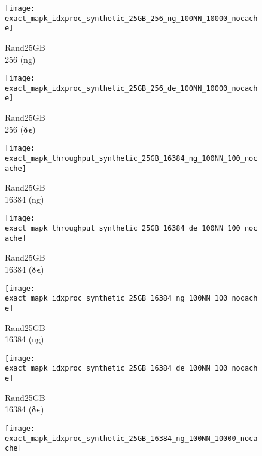 {{\begin{figure*}[!htb]
\begin{subfigure}{0.16\textwidth}
		\centering
		\texttt{[image: exact\_mapk\_idxproc\_synthetic\_25GB\_256\_ng\_100NN\_10000\_nocache]}
		\scriptsize \caption{Rand25GB\\256 (ng)} 
		\label{fig:approx:accuracy:efficiency:synthetic:25GB:256:hdd:ng:100NN:10K:nocache}
	\end{subfigure}
	\begin{subfigure}{0.16\textwidth}
		\centering
		\texttt{[image: exact\_mapk\_idxproc\_synthetic\_25GB\_256\_de\_100NN\_10000\_nocache]}
		\scriptsize \caption{Rand25GB\\256 ($\bm{\delta\epsilon}$)} 
		\label{fig:approx:accuracy:efficiency:synthetic:25GB:256:hdd:de:100NN:10K:nocache}
	\end{subfigure}
	\begin{subfigure}{0.16\textwidth}
		\centering
		\texttt{[image: exact\_mapk\_throughput\_synthetic\_25GB\_16384\_ng\_100NN\_100\_nocache]}
		\scriptsize \caption{Rand25GB\\16384 (ng)} 
		\label{fig:approx:accuracy:qefficiency:synthetic:25GB:16384:ng:hdd:100NN:100:nocache}
	\end{subfigure}
	\begin{subfigure}{0.16\textwidth}
		\centering
		\texttt{[image: exact\_mapk\_throughput\_synthetic\_25GB\_16384\_de\_100NN\_100\_nocache]}
		\scriptsize \caption{Rand25GB\\16384 ($\bm{\delta\epsilon}$)} 
		\label{fig:approx:accuracy:qefficiency:synthetic:25GB:16384:de:hdd:100NN:100:nocache}
	\end{subfigure}
	\begin{subfigure}{0.16\textwidth}
		\centering
		\texttt{[image: exact\_mapk\_idxproc\_synthetic\_25GB\_16384\_ng\_100NN\_100\_nocache]}
		\scriptsize \caption{Rand25GB\\16384 (ng)} 
		\label{fig:approx:accuracy:efficiency:synthetic:25GB:16384:ng:hdd:100NN:100:nocache}
	\end{subfigure}
	\begin{subfigure}{0.16\textwidth}
		\centering
		\texttt{[image: exact\_mapk\_idxproc\_synthetic\_25GB\_16384\_de\_100NN\_100\_nocache]}
		\scriptsize \caption{Rand25GB\\16384 ($\bm{\delta\epsilon}$)} 
		\label{fig:approx:accuracy:efficiency:synthetic:25GB:16384:de:hdd:100NN:100:nocache}
	\end{subfigure}
	\begin{subfigure}{0.16\textwidth}
		\centering
		\texttt{[image: exact\_mapk\_idxproc\_synthetic\_25GB\_16384\_ng\_100NN\_10000\_nocache]}

\end{subfigure}
\end{figure*}}}
